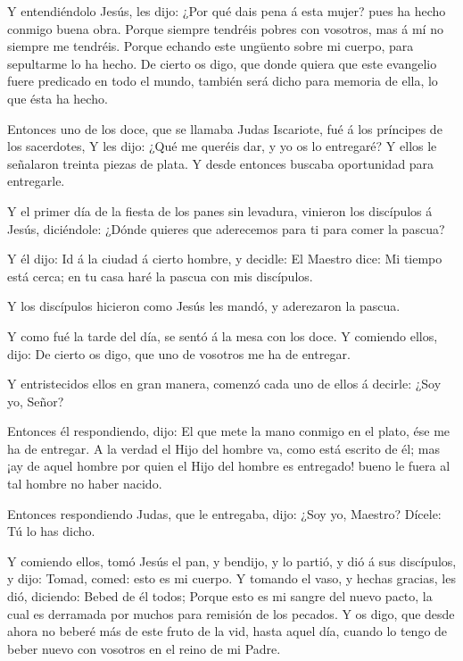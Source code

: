  Y entendiéndolo Jesús, les dijo: ¿Por qué dais pena á esta
mujer? pues ha hecho conmigo buena obra.  Porque siempre
tendréis pobres con vosotros, mas á mí no siempre me tendréis.
 Porque echando este ungüento sobre mi cuerpo, para
sepultarme lo ha hecho.  De cierto os digo, que donde
quiera que este evangelio fuere predicado en todo el mundo, también será
dicho para memoria de ella, lo que ésta ha hecho.

 Entonces uno de los doce, que se llamaba Judas Iscariote,
fué á los príncipes de los sacerdotes,  Y les dijo: ¿Qué me
queréis dar, y yo os lo entregaré? Y ellos le señalaron treinta piezas
de plata.  Y desde entonces buscaba oportunidad para
entregarle.

 Y el primer día de la fiesta de los panes sin levadura,
vinieron los discípulos á Jesús, diciéndole: ¿Dónde quieres que
aderecemos para ti para comer la pascua?

 Y él dijo: Id á la ciudad á cierto hombre, y decidle: El
Maestro dice: Mi tiempo está cerca; en tu casa haré la pascua con mis
discípulos.

 Y los discípulos hicieron como Jesús les mandó, y
aderezaron la pascua.

 Y como fué la tarde del día, se sentó á la mesa con los
doce.  Y comiendo ellos, dijo: De cierto os digo, que uno
de vosotros me ha de entregar.

 Y entristecidos ellos en gran manera, comenzó cada uno de
ellos á decirle: ¿Soy yo, Señor?

 Entonces él respondiendo, dijo: El que mete la mano
conmigo en el plato, ése me ha de entregar.  A la verdad el
Hijo del hombre va, como está escrito de él; mas ¡ay de aquel hombre por
quien el Hijo del hombre es entregado! bueno le fuera al tal hombre no
haber nacido.

 Entonces respondiendo Judas, que le entregaba, dijo: ¿Soy
yo, Maestro? Dícele: Tú lo has dicho.

 Y comiendo ellos, tomó Jesús el pan, y bendijo, y lo
partió, y dió á sus discípulos, y dijo: Tomad, comed: esto es mi cuerpo.
 Y tomando el vaso, y hechas gracias, les dió, diciendo:
Bebed de él todos;  Porque esto es mi sangre del nuevo
pacto, la cual es derramada por muchos para remisión de los pecados.
 Y os digo, que desde ahora no beberé más de este fruto de
la vid, hasta aquel día, cuando lo tengo de beber nuevo con vosotros en
el reino de mi Padre.

